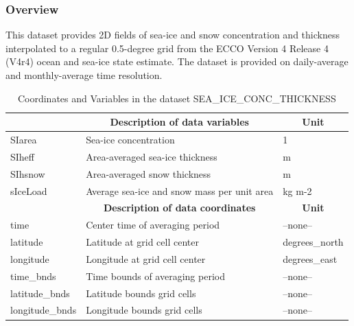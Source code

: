 \subsubsection{Overview}
This dataset provides 2D fields of sea-ice and snow concentration and thickness interpolated to a regular 0.5-degree grid from the ECCO Version 4 Release 4 (V4r4) ocean and sea-ice state estimate. The dataset is provided on daily-average and monthly-average time resolution. 
\begin{longtable}{|m{}|m{}|m{}|}
\caption{Coordinates and Variables in the dataset SEA\_ICE\_CONC\_THICKNESS}
\label{tab:table-SEA_ICE_CONC_THICKNESS-fields} \\ 
\hline \endhead \hline \endfoot
\rowcolor{lightgray} \multicolumn{1}{|c|}{\textbf{Variables}} & \multicolumn{1}{|c|}{\textbf{Description of data variables}} &  \multicolumn{1}{|c|}{\textbf{Unit}}\\ \hline
SIarea &Sea-ice concentration &1  \\ \hline
SIheff &Area-averaged sea-ice thickness &m  \\ \hline
SIhsnow &Area-averaged snow thickness &m  \\ \hline
sIceLoad &Average sea-ice and snow mass per unit area &kg m-2  \\ \hline
\rowcolor{lightgray} \multicolumn{1}{|c|}{\textbf{Coordinates}} & \multicolumn{1}{|c|}{\textbf{Description of data coordinates}} &  \multicolumn{1}{|c|}{\textbf{Unit}}\\ \hline
time &Center time of averaging period &--none--  \\ \hline
latitude &Latitude at grid cell center &degrees\_north  \\ \hline
longitude &Longitude at grid cell center &degrees\_east  \\ \hline
time\_bnds &Time bounds of averaging period &--none--  \\ \hline
latitude\_bnds &Latitude bounds grid cells &--none--  \\ \hline
longitude\_bnds &Longitude bounds grid cells &--none--  \\ \hline
\end{longtable}

\newp
\pagebreak
